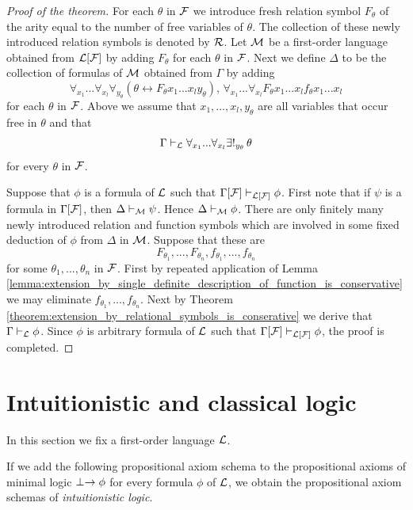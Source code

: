 \documentclass[10pt]{amsart}
\begin{document}
\begin{proof}[Proof of the theorem]
  For each $\theta$ in ${\mathcal F}$ we introduce fresh relation symbol $F_{\theta}$ of the arity equal to the number of free variables of $\theta$. The collection of these newly introduced relation symbols is denoted by ${\mathcal R}$. Let ${\mathcal M}$ be a first-order language obtained from ${\mathcal L}[{\mathcal F}]$ by adding $F_{\theta}$ for each $\theta$ in ${\mathcal F}$. Next we define $\Delta$ to be the collection of formulas of ${\mathcal M}$ obtained from $\Gamma$ by adding
  $$\forall_{x_1}...\forall_{x_l}\forall_{y_{\theta}}\left(\theta \leftrightarrow F_{\theta}x_1...x_ly_{\theta}\right),\,\forall_{x_1}...\forall_{x_l}F_{\theta}x_1...x_lf_{\theta}x_1...x_l$$
  for each $\theta$ in ${\mathcal F}$. Above we assume that $x_1,...,x_l,y_{\theta}$ are all variables that occur free in $\theta$ and that 
  $$\Gamma \vdash_{{\mathcal L}} \forall_{x_1}...\forall_{x_l}\exists!_{y_{\theta}}\,\theta$$
  for every $\theta$ in ${\mathcal F}$.

  Suppose that $\phi$ is a formula of ${\mathcal L}$ such that $\Gamma[{\mathcal F}] \vdash_{{\mathcal L}[{\mathcal F}]} \phi$. First note that if $\psi$ is a formula in $\Gamma[{\mathcal F}]$, then $\Delta \vdash_{{\mathcal M}}\psi$. Hence $\Delta \vdash_{{\mathcal M}} \phi$. There are only finitely many newly introduced relation and function symbols which are involved in some fixed deduction of $\phi$ from $\Delta$ in ${\mathcal M}$. Suppose that these are
  $$F_{\theta_1},...,F_{\theta_n},f_{\theta_1},...,f_{\theta_n}$$
  for some $\theta_1,...,\theta_n$ in ${\mathcal F}$. First by repeated application of Lemma \ref{lemma:extension_by_single_definite_description_of_function_is_conservative} we may eliminate $f_{\theta_1},...,f_{\theta_n}$. Next by Theorem \ref{theorem:extension_by_relational_symbols_is_conserative} we derive that $\Gamma \vdash_{{\mathcal L}}\phi$. Since $\phi$ is arbitrary formula of ${\mathcal L}$ such that $\Gamma[{\mathcal F}] \vdash_{{\mathcal L}[{\mathcal F}]} \phi$, the proof is completed.
\end{proof}

\section{Intuitionistic and classical logic}
\noindent
In this section we fix a first-order language ${\mathcal L}$.

\begin{definition}
	If we add the following propositional axiom schema to the propositional axioms of minimal logic $\perp \rightarrow \phi$ for every formula $\phi$ of ${\mathcal L}$, we obtain the propositional axiom schemas of \textit{intuitionistic logic}.
\end{definition}
\end{document}
